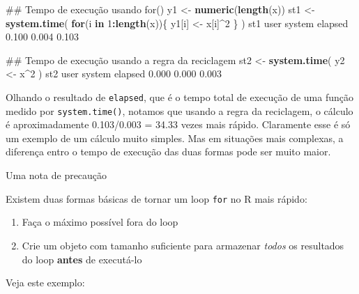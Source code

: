 \documentclass[10pt,a4paper]{book}
\newenvironment{Shaded}{\begin{snugshade}}{\end{snugshade}}
\newcommand{\KeywordTok}[1]{\textcolor[rgb]{0.13,0.29,0.53}{\textbf{#1}}}
\newcommand{\DecValTok}[1]{\textcolor[rgb]{0.00,0.00,0.81}{#1}}
\newcommand{\FloatTok}[1]{\textcolor[rgb]{0.00,0.00,0.81}{#1}}
\newcommand{\StringTok}[1]{\textcolor[rgb]{0.31,0.60,0.02}{#1}}
\newcommand{\ControlFlowTok}[1]{\textcolor[rgb]{0.13,0.29,0.53}{\textbf{#1}}}
\newcommand{\OperatorTok}[1]{\textcolor[rgb]{0.81,0.36,0.00}{\textbf{#1}}}
\newcommand{\NormalTok}[1]{#1}
\providecommand{\tightlist}{%
  \setlength{\itemsep}{0pt}\setlength{\parskip}{0pt}}
\begin{document}
\begin{Shaded}
\begin{Highlighting}[]
\NormalTok{## Tempo de execução usando for()}
\NormalTok{y1 <-}\StringTok{ }\KeywordTok{numeric}\NormalTok{(}\KeywordTok{length}\NormalTok{(x))}
\NormalTok{st1 <-}\StringTok{ }\KeywordTok{system.time}\NormalTok{(}
    \ControlFlowTok{for}\NormalTok{(i }\ControlFlowTok{in} \DecValTok{1}\OperatorTok{:}\KeywordTok{length}\NormalTok{(x))\{}
\NormalTok{        y1[i] <-}\StringTok{ }\NormalTok{x[i]}\OperatorTok{^}\DecValTok{2}
\NormalTok{    \}}
\NormalTok{)}
\NormalTok{st1}
\NormalTok{   user  system elapsed }
  \FloatTok{0.100}   \FloatTok{0.004}   \FloatTok{0.103} 

\NormalTok{## Tempo de execução usando a regra da reciclagem}
\NormalTok{st2 <-}\StringTok{ }\KeywordTok{system.time}\NormalTok{(}
\NormalTok{    y2 <-}\StringTok{ }\NormalTok{x}\OperatorTok{^}\DecValTok{2}
\NormalTok{)}
\NormalTok{st2}
\NormalTok{   user  system elapsed }
  \FloatTok{0.000}   \FloatTok{0.000}   \FloatTok{0.003} 
\end{Highlighting}
\end{Shaded}

Olhando o resultado de \texttt{elapsed}, que é o tempo total de execução
de uma função medido por \texttt{system.time()}, notamos que usando a
regra da reciclagem, o cálculo é aproximadamente 0.103/0.003 = 34.33
vezes mais rápido. Claramente esse é só um exemplo de um cálculo muito
simples. Mas em situações mais complexas, a diferença entro o tempo de
execução das duas formas pode ser muito maior.

Uma nota de precaução

Existem duas formas básicas de tornar um loop \texttt{for} no R mais
rápido:

\begin{enumerate}
\def\labelenumi{\arabic{enumi}.}
\tightlist
\item
  Faça o máximo possível fora do loop
\item
  Crie um objeto com tamanho suficiente para armazenar \emph{todos} os
  resultados do loop \textbf{antes} de executá-lo
\end{enumerate}

Veja este exemplo:
\end{document}
